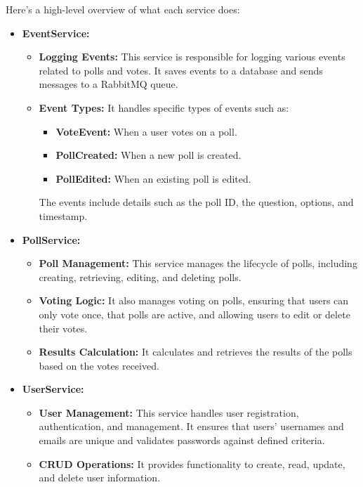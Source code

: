 Here’s a high-level overview of what each service does:
\begin{itemize}
    \item \textbf{EventService:}
    \begin{itemize}
        \item \textbf{Logging Events:} This service is responsible for logging various events related to polls and votes. It saves events to a database and sends messages to a RabbitMQ queue.
        \item \textbf{Event Types:} It handles specific types of events such as:
        \begin{itemize}	
            \item \textbf{VoteEvent:} When a user votes on a poll.
            \item \textbf{PollCreated:} When a new poll is created.
            \item \textbf{PollEdited:} When an existing poll is edited.
        \end{itemize}
        The events include details such as the poll ID, the question, options, and timestamp.
    \end{itemize}

    \item \textbf{PollService:}
    \begin{itemize}
        \item \textbf{Poll Management:} This service manages the lifecycle of polls, including creating, retrieving, editing, and deleting polls.
        \item \textbf{Voting Logic:} It also manages voting on polls, ensuring that users can only vote once, that polls are active, and allowing users to edit or delete their votes.
        \item \textbf{Results Calculation:} It calculates and retrieves the results of the polls based on the votes received.
    \end{itemize}

    \item \textbf{UserService:}
    \begin{itemize}
        \item \textbf{User Management:} This service handles user registration, authentication, and management. It ensures that users' usernames and emails are unique and validates passwords against defined criteria.
        \item \textbf{CRUD Operations:} It provides functionality to create, read, update, and delete user information.
    \end{itemize}


\end{itemize}
